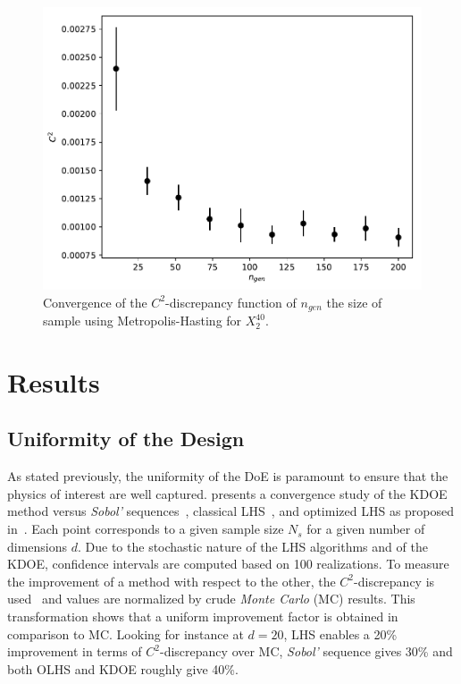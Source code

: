 \begin{figure}[!ht]
\centering
\includegraphics[width=0.8\linewidth,keepaspectratio]{fig/contributions/doe/conv_C2-Ngen-Kdoe2-40.pdf}
\caption{Convergence of the $C^2$-discrepancy function of $n_{gen}$ the size of sample using Metropolis-Hasting for $X_2^{40}$.}
\label{fig:conv-ngen}
\end{figure}


\section{Results}

\subsection{Uniformity of the Design}
As stated previously, the uniformity of the DoE is paramount to ensure that the physics of interest are well captured.  presents a convergence study of the KDOE method versus \emph{Sobol'} sequences~\citep{Sobol1967}, classical LHS~\citep{Mckay1979}, and optimized LHS as proposed in~\citep{Baudin2015}. Each point corresponds to a given sample size $N_s$ for a given number of dimensions $d$. Due to the stochastic nature of the LHS algorithms and of the KDOE, confidence intervals are computed based on 100 realizations. To measure the improvement of a method with respect to the other, the $C^2$-discrepancy is used~\citep{Fang2006,Androulakis2016} and values are normalized by crude \emph{Monte Carlo} (MC) results. This transformation shows that a uniform improvement factor is obtained in comparison to MC. Looking for instance at $d = 20$, LHS enables a 20\% improvement in terms of $C^2$-discrepancy over MC, \emph{Sobol'} sequence gives 30\% and both OLHS and KDOE roughly give 40\%.

